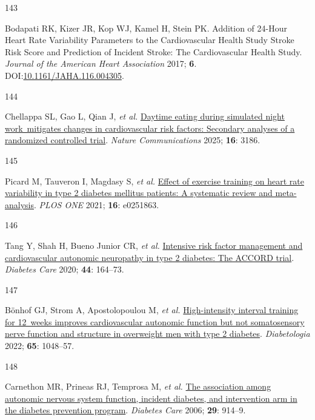 \documentclass[
  a4paper,
  headsepline=true,
  open=left]{scrbook}
\newlength{\cslhangindent}
\newlength{\csllabelwidth}
\newlength{\cslentryspacingunit} %
\newenvironment{CSLReferences}[2] %
 {%
  \setlength{\parindent}{0pt}
  \ifodd #1
  \let\oldpar\par
  \def\par{\hangindent=\cslhangindent\oldpar}
  \fi
  \setlength{\parskip}{#2\cslentryspacingunit}
 }%
 {}
\newcommand{\CSLLeftMargin}[1]{\parbox[t]{\csllabelwidth}{#1}}
\newcommand{\CSLRightInline}[1]{\parbox[t]{\linewidth - \csllabelwidth}{#1}\break}
\begin{document}
\begin{CSLReferences}{0}{0}
\leavevmode{}%
\CSLLeftMargin{143 }%
\CSLRightInline{Bodapati RK, Kizer JR, Kop WJ, Kamel H, Stein PK.
Addition of 24-Hour Heart Rate Variability Parameters to the
Cardiovascular Health Study Stroke Risk Score and Prediction of Incident
Stroke: The Cardiovascular Health Study. \emph{Journal of the American
Heart Association} 2017; \textbf{6}.
DOI:\href{https://doi.org/10.1161/JAHA.116.004305}{10.1161/JAHA.116.004305}.}

\leavevmode{}%
\CSLLeftMargin{144 }%
\CSLRightInline{Chellappa SL, Gao L, Qian J, \emph{et al.}
\href{https://doi.org/10.1038/s41467-025-57846-y}{Daytime eating during
simulated night work~mitigates changes in cardiovascular risk factors:
Secondary analyses of a randomized controlled trial}. \emph{Nature
Communications} 2025; \textbf{16}: 3186.}

\leavevmode{}%
\CSLLeftMargin{145 }%
\CSLRightInline{Picard M, Tauveron I, Magdasy S, \emph{et al.}
\href{https://doi.org/10.1371/journal.pone.0251863}{Effect of exercise
training on heart rate variability in type 2 diabetes mellitus patients:
A systematic review and meta-analysis}. \emph{PLOS ONE} 2021;
\textbf{16}: e0251863.}

\leavevmode{}%
\CSLLeftMargin{146 }%
\CSLRightInline{Tang Y, Shah H, Bueno Junior CR, \emph{et al.}
\href{https://doi.org/10.2337/dc20-1842}{Intensive risk factor
management and cardiovascular autonomic neuropathy in type 2 diabetes:
The ACCORD trial}. \emph{Diabetes Care} 2020; \textbf{44}: 164--73.}

\leavevmode{}%
\CSLLeftMargin{147 }%
\CSLRightInline{Bönhof GJ, Strom A, Apostolopoulou M, \emph{et al.}
\href{https://doi.org/10.1007/s00125-022-05674-w}{High-intensity
interval training for 12~weeks improves cardiovascular autonomic
function but not somatosensory nerve function and structure in
overweight men with type 2 diabetes}. \emph{Diabetologia} 2022;
\textbf{65}: 1048--57.}

\leavevmode{}%
\CSLLeftMargin{148 }%
\CSLRightInline{Carnethon MR, Prineas RJ, Temprosa M, \emph{et al.}
\href{https://doi.org/10.2337/diacare.29.04.06.dc05-1729}{The
association among autonomic nervous system function, incident diabetes,
and intervention arm in the diabetes prevention program}. \emph{Diabetes
Care} 2006; \textbf{29}: 914--9.}


\end{CSLReferences}
\end{document}
